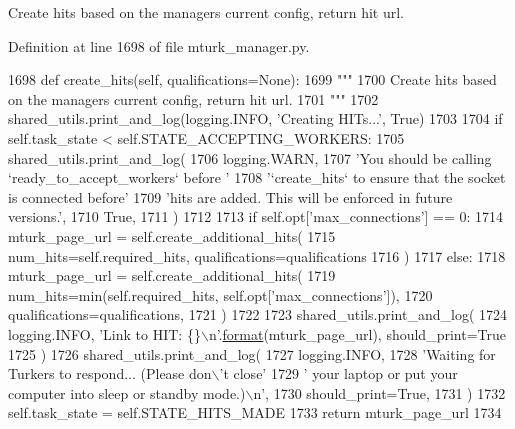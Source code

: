 \begin{DoxyVerb}Create hits based on the managers current config, return hit url.
\end{DoxyVerb}
 

Definition at line 1698 of file mturk\+\_\+manager.\+py.


\begin{DoxyCode}
1698     \textcolor{keyword}{def }create\_hits(self, qualifications=None):
1699         \textcolor{stringliteral}{"""}
1700 \textcolor{stringliteral}{        Create hits based on the managers current config, return hit url.}
1701 \textcolor{stringliteral}{        """}
1702         shared\_utils.print\_and\_log(logging.INFO, \textcolor{stringliteral}{'Creating HITs...'}, \textcolor{keyword}{True})
1703 
1704         \textcolor{keywordflow}{if} self.task\_state < self.STATE\_ACCEPTING\_WORKERS:
1705             shared\_utils.print\_and\_log(
1706                 logging.WARN,
1707                 \textcolor{stringliteral}{'You should be calling `ready\_to\_accept\_workers` before '}
1708                 \textcolor{stringliteral}{'`create\_hits` to ensure that the socket is connected before'}
1709                 \textcolor{stringliteral}{'hits are added. This will be enforced in future versions.'},
1710                 \textcolor{keyword}{True},
1711             )
1712 
1713         \textcolor{keywordflow}{if} self.opt[\textcolor{stringliteral}{'max\_connections'}] == 0:
1714             mturk\_page\_url = self.create\_additional\_hits(
1715                 num\_hits=self.required\_hits, qualifications=qualifications
1716             )
1717         \textcolor{keywordflow}{else}:
1718             mturk\_page\_url = self.create\_additional\_hits(
1719                 num\_hits=min(self.required\_hits, self.opt[\textcolor{stringliteral}{'max\_connections'}]),
1720                 qualifications=qualifications,
1721             )
1722 
1723         shared\_utils.print\_and\_log(
1724             logging.INFO, \textcolor{stringliteral}{'Link to HIT: \{\}\(\backslash\)n'}.\hyperlink{namespaceparlai_1_1chat__service_1_1services_1_1messenger_1_1shared__utils_a32e2e2022b824fbaf80c747160b52a76}{format}(mturk\_page\_url), should\_print=\textcolor{keyword}{True}
1725         )
1726         shared\_utils.print\_and\_log(
1727             logging.INFO,
1728             \textcolor{stringliteral}{'Waiting for Turkers to respond... (Please don\(\backslash\)'t close'}
1729             \textcolor{stringliteral}{' your laptop or put your computer into sleep or standby mode.)\(\backslash\)n'},
1730             should\_print=\textcolor{keyword}{True},
1731         )
1732         self.task\_state = self.STATE\_HITS\_MADE
1733         \textcolor{keywordflow}{return} mturk\_page\_url
1734 
\end{DoxyCode}
